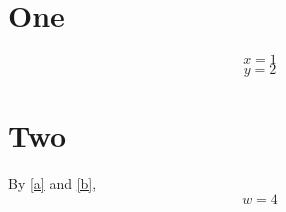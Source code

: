 \documentclass{article}
\numberwithin{equation}{section}
\begin{document}
\section{One}
\begin{equation}
x = 1 \label{a}
\end{equation}
\begin{equation}
y = 2
\end{equation}
\section{Two}
By \eqref{a} and \eqref{b},
\begin{equation}
w = 4 \label{b}
\end{equation}
\end{document}
